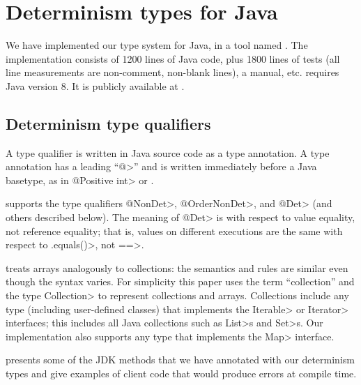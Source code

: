 \section{Determinism types for Java}\label{sec:java-types}

We have implemented our type system for Java, in a tool named \theDeterminismChecker.
The implementation consists of 1200 lines of Java
code, plus 1800 lines of tests (all line measurements are non-comment,
non-blank lines), a manual, etc.
\TheDeterminismChecker requires Java version 8.
It is publicly available at
.


\subsection{Determinism type qualifiers}

A type qualifier is written in Java source code as a type annotation.
A type annotation has a leading ``\<@>'' and is written immediately before a
Java basetype, as in \<@Positive int> or .

\TheDeterminismChecker supports the type qualifiers \<@NonDet>,
\<@OrderNonDet>, and \<@Det> (and others described below).
The meaning of \<@Det> is with respect to value
equality, not reference equality; that is,
values on different executions are the same with respect to \<.equals()>,
not \<==>.

\TheDeterminismChecker treats arrays analogously to collections:
the semantics and rules are similar even though the syntax varies.
For simplicity this
paper uses the term ``collection'' and the type \<Collection> to represent
collections and arrays.
Collections include any type (including user-defined classes) that
implements the \<Iterable> or \<Iterator> interfaces; this includes all
Java collections such as \<List>s and \<Set>s.
Our implementation also supports any type that implements the \<Map>
interface.


 presents some of the JDK methods that we have annotated with our determinism types and give examples of
client code that would produce errors at compile time.

